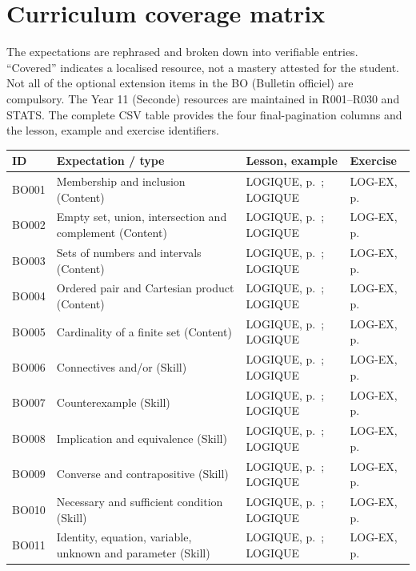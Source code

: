 \chapter{Curriculum coverage matrix}\label{MATRICE}
The expectations are rephrased and broken down into verifiable entries. ``Covered'' indicates a localised resource, not a mastery attested for the student. Not all of the optional extension items in the BO (Bulletin officiel) are compulsory. The Year 11 (Seconde) resources are maintained in R001--R030 and STATS. The complete CSV table provides the four final-pagination columns and the lesson, example and exercise identifiers.
\small\begin{longtable}{p{.1\linewidth}p{.43\linewidth}p{.19\linewidth}p{.16\linewidth}}\toprule ID & Expectation / type & Lesson, example & Exercise \\\midrule\endhead
BO001 & Membership and inclusion (Content) & LOGIQUE, p.\,\pageref{LOGIQUE} ; LOGIQUE & LOG-EX, p.\,\pageref{LOG-EX} \\
BO002 & Empty set, union, intersection and complement (Content) & LOGIQUE, p.\,\pageref{LOGIQUE} ; LOGIQUE & LOG-EX, p.\,\pageref{LOG-EX} \\
BO003 & Sets of numbers and intervals (Content) & LOGIQUE, p.\,\pageref{LOGIQUE} ; LOGIQUE & LOG-EX, p.\,\pageref{LOG-EX} \\
BO004 & Ordered pair and Cartesian product (Content) & LOGIQUE, p.\,\pageref{LOGIQUE} ; LOGIQUE & LOG-EX, p.\,\pageref{LOG-EX} \\
BO005 & Cardinality of a finite set (Content) & LOGIQUE, p.\,\pageref{LOGIQUE} ; LOGIQUE & LOG-EX, p.\,\pageref{LOG-EX} \\
BO006 & Connectives and/or (Skill) & LOGIQUE, p.\,\pageref{LOGIQUE} ; LOGIQUE & LOG-EX, p.\,\pageref{LOG-EX} \\
BO007 & Counterexample (Skill) & LOGIQUE, p.\,\pageref{LOGIQUE} ; LOGIQUE & LOG-EX, p.\,\pageref{LOG-EX} \\
BO008 & Implication and equivalence (Skill) & LOGIQUE, p.\,\pageref{LOGIQUE} ; LOGIQUE & LOG-EX, p.\,\pageref{LOG-EX} \\
BO009 & Converse and contrapositive (Skill) & LOGIQUE, p.\,\pageref{LOGIQUE} ; LOGIQUE & LOG-EX, p.\,\pageref{LOG-EX} \\
BO010 & Necessary and sufficient condition (Skill) & LOGIQUE, p.\,\pageref{LOGIQUE} ; LOGIQUE & LOG-EX, p.\,\pageref{LOG-EX} \\
BO011 & Identity, equation, variable, unknown and parameter (Skill) & LOGIQUE, p.\,\pageref{LOGIQUE} ; LOGIQUE & LOG-EX, p.\,\pageref{LOG-EX} \\

\end{longtable}
